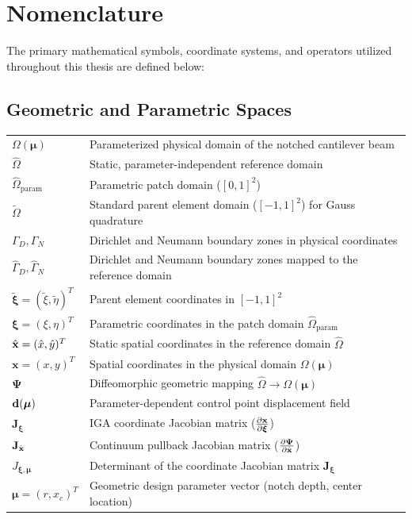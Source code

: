 \chapter*{Nomenclature}

\noindent The primary mathematical symbols, coordinate systems, and operators utilized throughout this thesis are defined below:

\section*{Geometric and Parametric Spaces}
\begin{tabular}{p{3.0cm} p{11.0cm}}
    $\Omega(\boldsymbol{\mu})$ & Parameterized physical domain of the notched cantilever beam \\
    $\hat{\Omega}$              & Static, parameter-independent reference domain \\
    $\hat{\Omega}_{\text{param}}$ & Parametric patch domain ($[0,1]^2$) \\
    $\tilde{\Omega}$            & Standard parent element domain ($[-1,1]^2$) for Gauss quadrature \\
    $\Gamma_D, \Gamma_N$        & Dirichlet and Neumann boundary zones in physical coordinates \\
    $\hat{\Gamma}_D, \hat{\Gamma}_N$ & Dirichlet and Neumann boundary zones mapped to the reference domain \\
    $\tilde{\boldsymbol{\xi}} = (\tilde{\xi}, \tilde{\eta})^T$ & Parent element coordinates in $[-1,1]^2$ \\
    $\boldsymbol{\xi} = (\xi, \eta)^T$ & Parametric coordinates in the patch domain $\hat{\Omega}_{\text{param}}$ \\
    $\hat{\mathbf{x}} = (\hat{x}, \hat{y})^T$ & Static spatial coordinates in the reference domain $\hat{\Omega}$ \\
    $\boldsymbol{x} = (x, y)^T$ & Spatial coordinates in the physical domain $\Omega(\boldsymbol{\mu})$ \\
    $\boldsymbol{\Psi}$          & Diffeomorphic geometric mapping $\hat{\Omega} \to \Omega(\boldsymbol{\mu})$ \\
    $\mathbf{d}(\boldsymbol{\mu})$ & Parameter-dependent control point displacement field \\
    $\mathbf{J}_{\boldsymbol{\xi}}$ & IGA coordinate Jacobian matrix ($\frac{\partial \mathbf{x}}{\partial \boldsymbol{\xi}}$) \\
    $\mathbf{J}_{\hat{\mathbf{x}}}$   & Continuum pullback Jacobian matrix ($\frac{\partial \boldsymbol{\Psi}}{\partial \hat{\mathbf{x}}}$) \\
    $J_{\boldsymbol{\xi}, \boldsymbol{\mu}}$ & Determinant of the coordinate Jacobian matrix $\mathbf{J}_{\boldsymbol{\xi}}$ \\
    $\boldsymbol{\mu} = (r, x_c)^T$ & Geometric design parameter vector (notch depth, center location) \\
\end{tabular}

